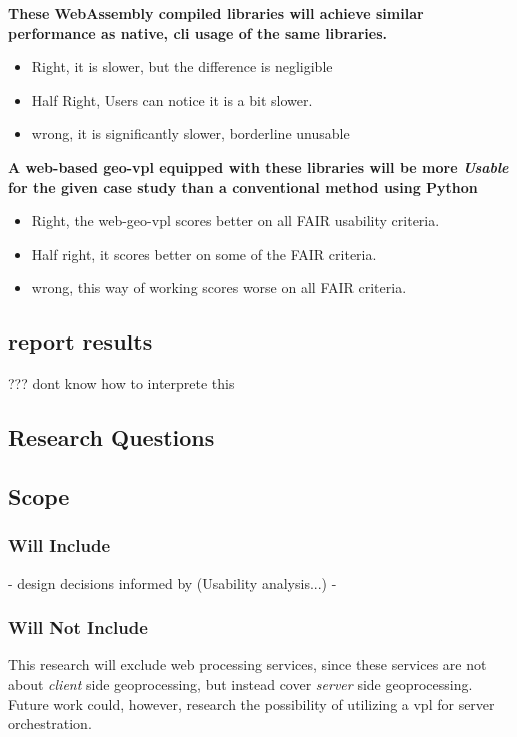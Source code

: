 \textbf{These WebAssembly compiled libraries will achieve similar performance as native, cli usage of the same libraries.}
\begin{itemize}
    \item Right, it is slower, but the difference is negligible 
    \item Half Right, Users can notice it is a bit slower.
    \item wrong, it is significantly slower, borderline unusable  
\end{itemize}

\textbf{A web-based geo-vpl equipped with these libraries will be more \emph{Usable} for the given case study than a conventional method using Python}

\begin{itemize}
    \item Right, the web-geo-vpl scores better on all FAIR usability criteria.
    \item Half right, it scores better on some of the FAIR criteria.
    \item wrong, this way of working scores worse on all FAIR criteria.
\end{itemize}



\subsection{report results}
??? dont know how to interprete this 



\subsection{Research Questions}





\subsection{Scope}


\subsubsection*{Will Include}

- design decisions informed by (Usability analysis...)
- 


\subsubsection*{Will Not Include}
This research will exclude web processing services, since these services are not about \emph{client} side geoprocessing, but instead cover \emph{server} side geoprocessing. 
Future work could, however, research the possibility of utilizing a vpl for server orchestration. 


